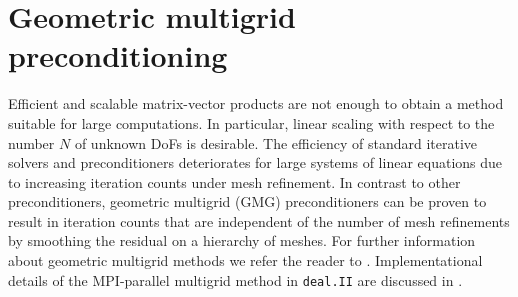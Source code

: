 \documentclass[times,doublespace]{nmeauth}
\newcommand{\changeJP}[1]{#1}
\begin{document}
\section{Geometric multigrid preconditioning}
\label{sec:gmg}

Efficient and scalable matrix-vector products are not enough to obtain a method suitable for large computations. In particular, linear scaling with respect to the number $N$ of unknown DoFs is desirable.
The efficiency of standard iterative solvers and preconditioners deteriorates for large systems of linear equations due to increasing iteration counts under mesh refinement.
In contrast to other preconditioners, geometric multigrid (GMG) preconditioners \cite{Bramble1990, Briggs2000, Janssen2011,May2015} can be proven to result in iteration counts that are independent of the number of mesh refinements by smoothing the residual on a hierarchy of meshes. For further information about geometric multigrid methods we refer the reader to \cite{Briggs2000,Hackbusch1985,Wesseling1992}.
\changeJP{Implementational details of the MPI-parallel multigrid method in \texttt{deal.II} are discussed in \cite{Clevenger2018}.}
\end{document}
